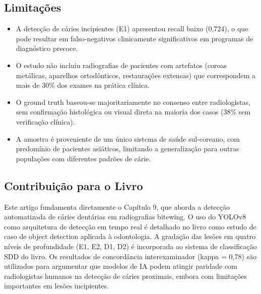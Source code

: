 \subsection{Limitações}
\begin{itemize}
  \item A detecção de cáries incipientes (E1) apresentou recall baixo
        (0,724), o que pode resultar em falso-negativos clinicamente
        significativos em programas de diagnóstico precoce.
  \item O estudo não incluiu radiografias de pacientes com artefatos
        (coroas metálicas, aparelhos ortodônticos, restaurações extensas)
        que correspondem a mais de 30\% dos exames na prática clínica.
  \item O ground truth baseou-se majoritariamente no consenso entre
        radiologistas, sem confirmação histológica ou visual direta na
        maioria dos casos (38\% sem verificação clínica).
  \item A amostra é proveniente de um único sistema de saúde sul-coreano,
        com predomínio de pacientes asiáticos, limitando a generalização
        para outras populações com diferentes padrões de cárie.
\end{itemize}

\subsection{Contribuição para o Livro}
Este artigo fundamenta diretamente o Capítulo 9, que aborda a detecção
automatizada de cáries dentárias em radiografias bitewing. O uso do
YOLOv8 como arquitetura de detecção em tempo real é detalhado no livro
como estudo de caso de object detection aplicada à odontologia. A
gradação das lesões em quatro níveis de profundidade (E1, E2, D1, D2)
é incorporada ao sistema de classificação SDD do livro. Os resultados
de concordância interexaminador (kappa = 0,78) são utilizados para
argumentar que modelos de IA podem atingir paridade com radiologistas
humanos na detecção de cáries proximais, embora com limitações
importantes em lesões incipientes.

